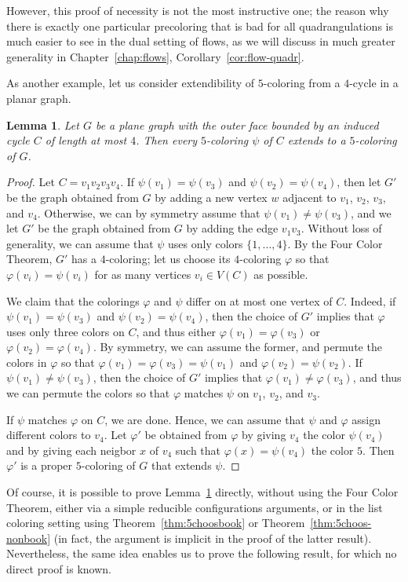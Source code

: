 \documentclass[12pt,twoside,openright,a4paper]{book}
\newtheorem{lemma}[theorem]{Lemma}
\begin{document}
However, this proof of necessity is not the most instructive one; the reason why there is exactly one particular
precoloring that is bad for all quadrangulations is much easier to see in the dual setting of flows, as we will
discuss in much greater generality in Chapter~\ref{chap:flows}, Corollary~\ref{cor:flow-quadr}.

As another example, let us consider extendibility of $5$-coloring from a $4$-cycle in a planar graph.
\begin{lemma}\label{lemma:extend54}
Let $G$ be a plane graph with the outer face bounded by an induced cycle $C$ of length at most $4$.
Then every $5$-coloring $\psi$ of $C$ extends to a $5$-coloring of $G$.
\end{lemma}
\begin{proof}
Let $C=v_1v_2v_3v_4$.  If $\psi(v_1)=\psi(v_3)$ and $\psi(v_2)=\psi(v_4)$, then let $G'$ be the graph
obtained from $G$ by adding a new vertex $w$ adjacent to $v_1$, $v_2$, $v_3$, and $v_4$.  Otherwise,
we can by symmetry assume that $\psi(v_1)\neq\psi(v_3)$, and we let $G'$ be the graph obtained from $G$
by adding the edge $v_1v_3$.  Without loss of generality, we can assume that $\psi$ uses only colors
$\{1,\ldots,4\}$.  By the Four Color Theorem, $G'$ has a $4$-coloring; let us choose its $4$-coloring $\varphi$
so that $\varphi(v_i)=\psi(v_i)$ for as many vertices $v_i\in V(C)$ as possible.

We claim that the colorings $\varphi$ and $\psi$ differ on at most one vertex of $C$.  Indeed, if $\psi(v_1)=\psi(v_3)$ and $\psi(v_2)=\psi(v_4)$,
then the choice of $G'$ implies that $\varphi$ uses only three colors on $C$, and thus either $\varphi(v_1)=\varphi(v_3)$ or $\varphi(v_2)=\varphi(v_4)$.
By symmetry, we can assume the former, and permute the colors in $\varphi$ so that $\varphi(v_1)=\varphi(v_3)=\psi(v_1)$ and $\varphi(v_2)=\psi(v_2)$.
If $\psi(v_1)\neq\psi(v_3)$, then the choice of $G'$ implies that $\varphi(v_1)\neq \varphi(v_3)$, and thus we can permute the colors so that $\varphi$
matches $\psi$ on $v_1$, $v_2$, and $v_3$.

If $\psi$ matches $\varphi$ on $C$, we are done.  Hence, we can assume that $\psi$ and $\varphi$ assign different colors to $v_4$.  Let $\varphi'$ be
obtained from $\varphi$ by giving $v_4$ the color $\psi(v_4)$ and by giving each neigbor $x$ of $v_4$ such that $\varphi(x)=\psi(v_4)$ the color $5$.
Then $\varphi'$ is a proper $5$-coloring of $G$ that extends $\psi$.
\end{proof}
Of course, it is possible to prove Lemma~\ref{lemma:extend54} directly, without using the Four Color Theorem, either via a simple reducible configurations arguments,
or in the list coloring setting using Theorem~\ref{thm:5choosbook} or Theorem~\ref{thm:5choos-nonbook} (in fact, the argument is implicit in the proof of the
latter result).  Nevertheless, the same idea enables us to prove the following result, for which no direct proof is known.
\end{document}
